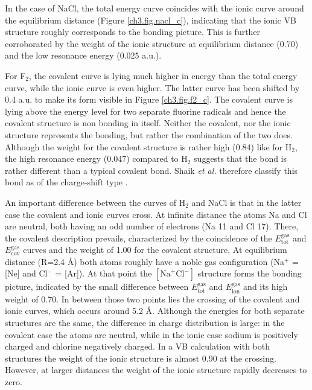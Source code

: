 In the case of NaCl, the total energy curve coincides with the ionic curve around the equilibrium distance (Figure \ref{ch3.fig.nacl_c}), indicating that the ionic VB structure roughly corresponds to the bonding picture. This is further corroborated by the weight of the ionic structure at equilibrium distance (0.70) and the low resonance energy (0.025 a.u.).

For F$_2$, the covalent curve is lying much higher in energy than the total energy curve, while the ionic curve is even higher. The latter curve has been shifted by 0.4 a.u. to make its form visible in Figure \ref{ch3.fig.f2_c}. The covalent curve is lying above the energy level for two separate fluorine radicals and hence the covalent structure is non bonding in itself. Neither the covalent, nor the ionic structure represents the bonding, but rather the combination of the two does. Although the weight for the covalent structure is rather high (0.84) like for H$_2$, the high resonance energy (0.047) compared to H$_2$ suggests that the bond is rather different than a typical covalent bond. Shaik \textit{et al.} therefore classify this bond as of the charge-shift type \cite{cs1,cs2}.

An important difference between the curves of H$_2$ and NaCl is that in the latter case the covalent and ionic curves cross. At infinite distance the atoms Na and Cl are neutral, both having an odd number of electrons (Na 11 and Cl 17). There, the covalent description prevails, characterized by the coincidence of the $E_\mathrm{tot}^\mathrm{gas}$ and $E_\mathrm{cov}^\mathrm{gas}$ curves and the weight of 1.00 for the covalent structure. At equilibrium distance (R=2.4 \AA) both atoms roughly have a noble gas configuration (Na$^{+}$ = [Ne] and Cl$^{-}$ = [Ar]). At that point the $[\mathrm{Na}^{+}\mathrm{Cl}^{-}]$ structure forms the bonding picture, indicated by the small difference between $E_\mathrm{tot}^\mathrm{gas}$ and $E_\mathrm{ion}^\mathrm{gas}$ and its high weight of 0.70. In between those two points lies the crossing of the covalent and ionic curves, which occurs around 5.2 \AA. Although the energies for both separate structures are the same, the difference in charge distribution is large: in the covalent case the atoms are neutral, while in the ionic case sodium is positively charged and chlorine negatively charged. In a VB calculation with both structures the weight of the ionic structure is almost 0.90 at the crossing. However, at larger distances the weight of the ionic structure rapidly decreases to zero.

